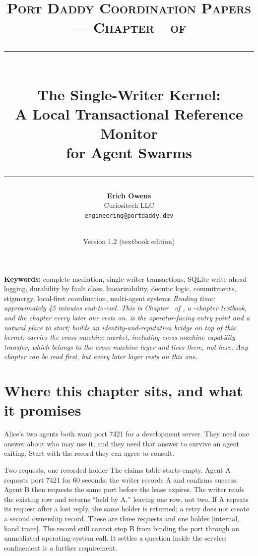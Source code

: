 \documentclass[11pt,a4paper]{article}
\title{
  \vspace{-1cm}
  {\Large\textsc{Port Daddy Coordination Papers --- Chapter~\pdchapternumber\ of \pdchaptercount}}\\[
0.5cm]
  \rule{\textwidth}{0.5pt}\\[0.3cm]
  {\LARGE\textbf{The Single-Writer Kernel:}}\\[0.2cm]
  {\Large A Local Transactional Reference Monitor\\for Agent Swarms}\\[0.3cm]
  \rule{\textwidth}{0.5pt}
}
\author{
  \textbf{Erich Owens}\\[0.2cm]
  Curiositech LLC\\[0.2cm]
  \texttt{engineering@portdaddy.dev}
}
\date{\pdeditiondate\\Version 1.2 (textbook edition)}
\theoremstyle{definition}
\theoremstyle{remark}
\begin{document}
\pdopensolutions
\setlength{\emergencystretch}{2em}
\maketitle
\thispagestyle{empty}
\vspace{0.6cm}
\vspace{0.4cm}
\noindent\textbf{Keywords:} complete mediation, single-writer transactions, SQLite
write-ahead logging, durability by fault class, linearizability, deontic logic,
commitments, stigmergy, local-first coordination, multi-agent systems
\vspace{0.4cm}
\noindent\textit{Reading time: approximately 45 minutes end-to-end. This is Chapter~\pdchapternumber{} of \pdbooktitle{}, a
\pdchaptercountword-chapter textbook, and the chapter every later one rests on.
 is the operator-facing entry point and a natural
place to start;  builds an
identity-and-reputation bridge on top of this kernel;  carries the cross-machine market, including
cross-machine capability transfer, which belongs to the cross-machine layer and
lives there, not here. Any chapter can be read first, but every later layer rests on
this one.}
\tableofcontents
\newpage
\section{Where this chapter sits, and what it promises}
Alice's two agents both want port 7421 for a development server. They need
one answer about who may use it, and they need that answer to survive an agent
exiting. Start with the record they can agree to consult.

\begin{pdexample}{Two requests, one recorded holder}
The claims table starts empty. Agent A requests port 7421 for 60 seconds;
the writer records A and confirms success. Agent B then requests the same
port before the lease expires. The writer reads the existing row and returns
``held by A,'' leaving one row, not two. If A repeats its request after a
lost reply, the same holder is returned; a retry does not create a second
ownership record. These are three requests and one holder [internal,
hand trace]. The record still cannot stop B from binding the port through an
unmediated operating-system call. It settles a question inside the service;
confinement is a further requirement.
\end{pdexample}
\end{document}
